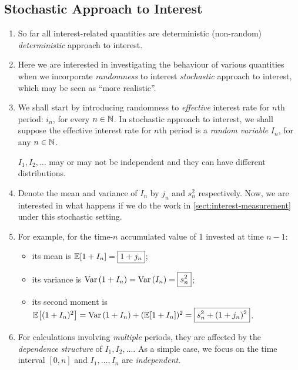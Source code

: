 \subsection{Stochastic Approach to Interest}
\label{subsect:stochastic-int}
\begin{enumerate}
\item So far all interest-related quantities are deterministic (non-random)
 \emph{deterministic} approach to interest.

\item Here we are interested in investigating the behaviour of various
quantities when we incorporate \emph{randomness} to interest
 \emph{stochastic} approach to interest, which may be seen
as ``more realistic''.

\item We shall start by introducing randomness to \emph{effective} interest
rate for \(n\)th period: \(i_n\), for every \(n\in\mathbb{N}\). In stochastic approach
to interest, we shall suppose the effective interest rate for \(n\)th period is
a \emph{random variable} \(I_n\), for any \(n\in\mathbb{N}\).

\begin{note}
\(I_1,I_2,\dotsc\) may or may not be independent and they can have different
distributions.
\end{note}

\item Denote the mean and variance of \(I_n\) by \(j_n\) and \(s_n^2\)
respectively. Now, we are interested in what happens if we do the work in
\cref{sect:interest-measurement} under this stochastic setting.

\item \label{it:stoch-acc-value-prob-quantities-one-period}
For example, for the time-\(n\) accumulated value of 1 invested at time
\(n-1\):
\begin{itemize}
\item its mean is \(\mathbb{E}\qty[1+I_n]=\boxed{1+j_n}\);
\item its variance is \(\operatorname{Var}\qty(1+I_n)=\operatorname{Var}\qty(I_n)=\boxed{s_n^2}\);
\item its second moment is
\(\mathbb{E}\qty[(1+I_n)^{2}]=\operatorname{Var}\qty(1+I_n)+(\mathbb{E}\qty[1+I_n])^{2}=\boxed{s_n^2+(1+j_n)^2}\).
\end{itemize}
\item \label{it:stoch-acc-value-prob-quantities-n-periods}
For calculations involving \emph{multiple} periods, they are affected by
the \emph{dependence structure} of \(I_1,I_2,\dotsc\). As a simple case, we
focus on the time interval \([0,n]\) and \(I_1,\dotsc,I_n\) are
\emph{independent}.


\end{enumerate}
